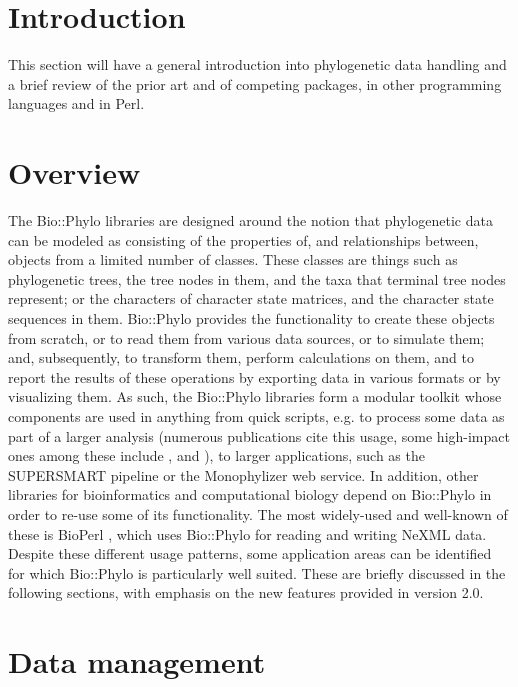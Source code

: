 \documentclass{bioinfo}
\begin{document}
\section{Introduction}

This section will have a general introduction into phylogenetic data handling and a brief
review of the prior art and of competing packages, in other programming languages and in
Perl.

\section{Overview}

The Bio::Phylo libraries are designed around the notion that phylogenetic data can be 
modeled as consisting of the properties of, and relationships between, objects from a 
limited number of classes. These classes are things such as phylogenetic trees, the tree 
nodes in them, and the taxa that terminal tree nodes represent; or the characters of 
character state matrices, and the character state sequences in them. Bio::Phylo provides 
the functionality to create these objects from scratch, or to read them from various data 
sources, or to simulate them; and, subsequently, to transform them, perform calculations 
on them, and to report the results of these operations by exporting data in various 
formats or by visualizing them. As such, the Bio::Phylo libraries form a modular toolkit 
whose components are used in anything from quick scripts, e.g. to process some data as 
part of a larger analysis (numerous publications cite this usage, some high-impact ones 
among these include \citet{Hayward2015}, \citet{Hayward2013} and \citet{Smet2013}), to 
larger applications, such as the SUPERSMART pipeline \citep{Antonelli2017} or the 
Monophylizer \citep{Mutanen2016} web service. In addition, other libraries for 
bioinformatics and computational biology depend on Bio::Phylo in order to re-use some of 
its functionality. The most widely-used and well-known of these is BioPerl 
\citep{Stajich2002}, which uses Bio::Phylo for reading and writing NeXML \citep{Vos2012} 
data. Despite these different usage patterns, some application areas can be identified for 
which Bio::Phylo is particularly well suited. These are briefly discussed in the following 
sections, with emphasis on the new features provided in version 2.0.

\section{Data management}
\end{document}
